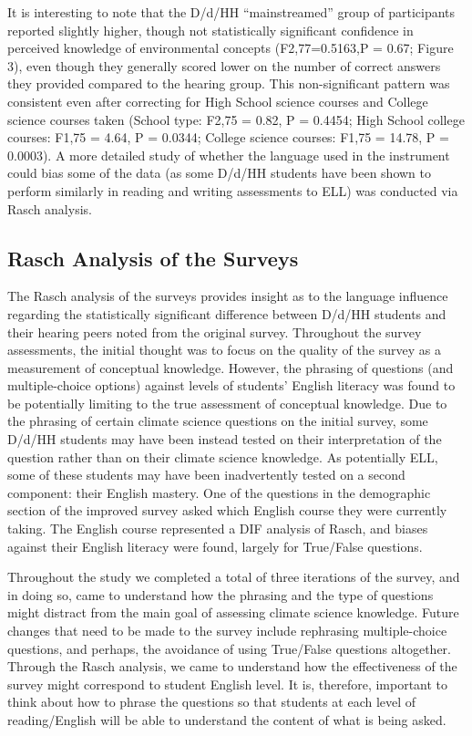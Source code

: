 \documentclass[11.5pt]{sig-alternate} %
\begin{document}
\begin{large}
It is interesting to note that the D/d/HH “mainstreamed” group of participants reported slightly higher, though not statistically significant confidence in perceived knowledge of environmental concepts (F2,77=0.5163,P = 0.67; Figure 3), even though they generally scored lower on the number of correct answers they provided compared to the hearing group. This non-significant pattern was consistent even after correcting for High School science courses and College science courses taken (School type: F2,75 = 0.82, P = 0.4454; High School college courses: F1,75 = 4.64, P = 0.0344; College science courses: F1,75 = 14.78, P = 0.0003).  A more detailed study of whether the language used in the instrument could bias some of the data (as some D/d/HH students have been shown to perform similarly in reading and writing assessments to ELL) was conducted via Rasch analysis. 

\subsection*{Rasch Analysis of the Surveys}

The Rasch analysis of the surveys provides insight as to the language influence regarding the statistically significant difference between D/d/HH students and their hearing peers noted from the original survey.  Throughout the survey assessments, the initial thought was to focus on the quality of the survey as a measurement of conceptual knowledge. However, the phrasing of questions (and multiple-choice options) against levels of students’ English literacy was found to be potentially limiting to the true assessment of conceptual knowledge. Due to the phrasing of certain climate science questions on the initial survey, some D/d/HH students may have been instead tested on their interpretation of the question rather than on their climate science knowledge.  As potentially ELL, some of these students may have been inadvertently tested on a second component: their English mastery. One of the questions in the demographic section of the improved survey asked which English course they were currently taking. The English course represented a DIF analysis of Rasch, and biases against their English literacy were found, largely for True/False questions. 

Throughout the study we completed a total of three iterations of the survey, and in doing so, came to understand how the phrasing and the type of questions might distract from the main goal of assessing climate science knowledge. Future changes that need to be made to the survey include rephrasing multiple-choice questions, and perhaps, the avoidance of using True/False questions altogether. Through the Rasch analysis, we came to understand how the effectiveness of the survey might correspond to student English level.  It is, therefore, important to think about how to phrase the questions so that students at each level of reading/English will be able to understand the content of what is being asked. 
	

\end{large}
\end{document}

